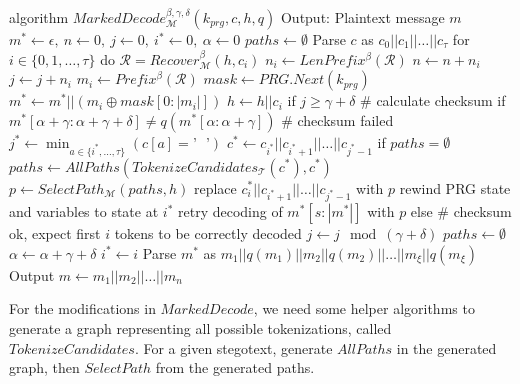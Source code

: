 \begin{Pseudocode}[caption={
$MarkedDecode$ Algorithm.
In comparison to Meteor's $Decode$ algorithm, $MarkedDecode$ verifies the checksum $q(m_i)$ of blocks $m_i$.
If the checksum does not match, a decoding error occured.
It then performs a lookbehind on the stegotext and generates all possible tokenizations $paths$ for a substring of $c$.
Afterwards, rewind the internal state and retry decoding with a path $p$ selected from $paths$.
}, label={alg:marked-decode}]
algorithm $MarkedDecode_{\mathcal{M}}^{\beta,\gamma,\delta}(k_{prg}, c, h, q)$
	Output: Plaintext message $m$
	$m^* \leftarrow \epsilon,~ n \leftarrow 0,~ j \leftarrow 0,~ i^* \leftarrow 0,~ \alpha \leftarrow 0$
	$paths \leftarrow \emptyset$
	Parse $c$ as $c_0 || c_1 || \dots || c_{\tau}$
	for $i \in \{ 0, 1, \dots, \tau \}$ do
		$\mathcal{R} = Recover_{\mathcal{M}}^\beta(h, c_i)$
		$n_i \leftarrow LenPrefix^\beta(\mathcal{R})$
		$n \leftarrow n + n_i$
		$j \leftarrow j + n_i$
		$m_i \leftarrow Prefix^\beta(\mathcal{R})$
		$mask \leftarrow PRG.Next(k_{prg})$
		$m^* \leftarrow m^* || (m_i \oplus mask[0: |m_i|])$
		$h \leftarrow h||c_i$
		if $j \geq \gamma + \delta$
			# calculate checksum
			if $m^*[\alpha+\gamma:\alpha+\gamma+\delta] \neq q(m^*[\alpha:\alpha+\gamma])$  # checksum failed
				$j^* \leftarrow \min_{a \in \{ i^*, \dots, \tau \}} (c[a] = \textrm{'~ '})$
				$c^* \leftarrow c_{i^*} || c_{i^*+1} || \dots || c_{j^*-1}$
				if $paths = \emptyset$
					$paths \leftarrow AllPaths(TokenizeCandidates_{\mathcal{T}}(c^*), c^*)$
				$p \leftarrow SelectPath_{\mathcal{M}}(paths, h)$
				replace $c_i^*||c_{i^*+1}||\dots||c_{j^*-1}$ with $p$
				rewind PRG state and variables to state at $i^*$
				retry decoding of $m^*[s:|m^*|]$ with $p$
			else  # checksum ok, expect first $i$ tokens to be correctly decoded
				$j \leftarrow j \mod (\gamma+\delta)$
				$paths \leftarrow \emptyset$
				$\alpha \leftarrow \alpha + \gamma + \delta$
				$i^* \leftarrow i$
	Parse $m^*$ as $m_1||q(m_1)||m_2||q(m_2)||\dots||m_\xi||q(m_\xi)$
	Output $m \leftarrow m_1||m_2||\dots||m_n$
\end{Pseudocode}


For the modifications in $MarkedDecode$, we need some helper algorithms to generate a graph representing all possible tokenizations, called $TokenizeCandidates$. 
For a given stegotext, generate $AllPaths$ in the generated graph, then $SelectPath$ from the generated paths.

